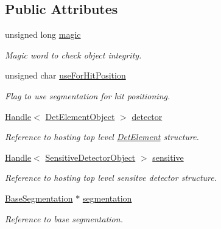 \subsection*{Public Attributes}
\begin{DoxyCompactItemize}
\item 
unsigned long \hyperlink{class_d_d4hep_1_1_geometry_1_1_segmentation_object_a2fb8a80e389d915e7c74499f09fd341b}{magic}
\begin{DoxyCompactList}\small\item\em Magic word to check object integrity. \end{DoxyCompactList}\item 
unsigned char \hyperlink{class_d_d4hep_1_1_geometry_1_1_segmentation_object_a50926f063e074096e83ee667d70114a7}{use\+For\+Hit\+Position}
\begin{DoxyCompactList}\small\item\em Flag to use segmentation for hit positioning. \end{DoxyCompactList}\item 
\hyperlink{class_d_d4hep_1_1_handle}{Handle}$<$ \hyperlink{class_d_d4hep_1_1_geometry_1_1_det_element_object}{Det\+Element\+Object} $>$ \hyperlink{class_d_d4hep_1_1_geometry_1_1_segmentation_object_aa9f9012806e2dfff465ae66650f10b94}{detector}
\begin{DoxyCompactList}\small\item\em Reference to hosting top level \hyperlink{class_d_d4hep_1_1_geometry_1_1_det_element}{Det\+Element} structure. \end{DoxyCompactList}\item 
\hyperlink{class_d_d4hep_1_1_handle}{Handle}$<$ \hyperlink{class_d_d4hep_1_1_geometry_1_1_sensitive_detector_object}{Sensitive\+Detector\+Object} $>$ \hyperlink{class_d_d4hep_1_1_geometry_1_1_segmentation_object_ae62042fd318764e7744b87de21cb25ad}{sensitive}
\begin{DoxyCompactList}\small\item\em Reference to hosting top level sensitve detector structure. \end{DoxyCompactList}\item 
\hyperlink{class_d_d4hep_1_1_geometry_1_1_segmentation_object_a57ca8eb515f079fdc61916df50468818}{Base\+Segmentation} $\ast$ \hyperlink{class_d_d4hep_1_1_geometry_1_1_segmentation_object_a96eb25f8256d85ec907729f371ad315c}{segmentation}
\begin{DoxyCompactList}\small\item\em Reference to base segmentation. \end{DoxyCompactList}\end{DoxyCompactItemize}


